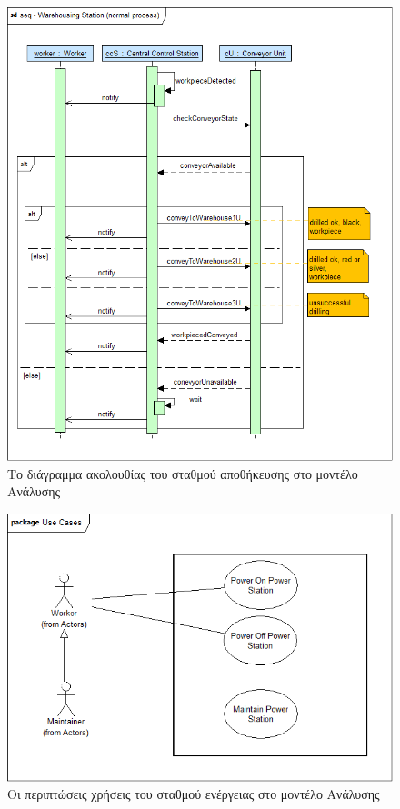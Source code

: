 \documentclass[a4paper,12pt,twoside]{report}
\begin{document}
{\begin{appendices}
			\begin{figure}[hp]
					\centering
					\includegraphics[scale=0.30]{AnalysisModel_seq-WarehousingStation(normalprocess).png}
					\caption{Το διάγραμμα ακολουθίας του σταθμού αποθήκευσης στο μοντέλο Ανάλυσης}
					\label{φωτ:Το διάγραμμα ακολουθίας του σταθμού αποθήκευσης στο μοντέλο Ανάλυσης}
			\end{figure}
			
			\begin{figure}[hp]
					\centering
					\includegraphics[scale=0.30]{AnalysisModel_uc-CentralEnergyStationsUseCases.png}
					\caption{Οι περιπτώσεις χρήσεις του σταθμού ενέργειας στο μοντέλο Ανάλυσης}
					\label{φωτ:Οι περιπτώσεις χρήσεις του σταθμού ενέργειας στο μοντέλο Ανάλυσης}
			\end{figure}
			

\end{appendices}}
\end{document}
